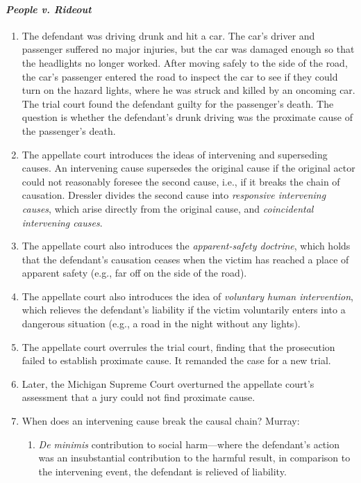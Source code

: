 \paragraph{\emph{People v. Rideout}}

\begin{enumerate}
    \item The defendant was driving drunk and hit a car. The car's driver and passenger suffered no major injuries, but the car was damaged enough so that the headlights no longer worked. After moving safely to the side of the road, the car's passenger entered the road to inspect the car to see if they could turn on the hazard lights, where he was struck and killed by an oncoming car. The trial court found the defendant guilty for the passenger's death. The question is whether the defendant's drunk driving was the proximate cause of the passenger's death.
    \item The appellate court introduces the ideas of intervening and superseding causes. An intervening cause supersedes the original cause if the original actor could not reasonably foresee the second cause, i.e., if it breaks the chain of causation. Dressler divides the second cause into \emph{responsive intervening causes}, which arise directly from the original cause, and \emph{coincidental intervening causes}.
    \item The appellate court also introduces the \emph{apparent-safety doctrine}, which holds that the defendant's causation ceases when the victim has reached a place of apparent safety (e.g., far off on the side of the road).
    \item The appellate court also introduces the idea of \emph{voluntary human intervention}, which relieves the defendant's liability if the victim voluntarily enters into a dangerous situation (e.g., a road in the night without any lights).
    \item The appellate court overrules the trial court, finding that the prosecution failed to establish proximate cause. It remanded the case for a new trial.
    \item Later, the Michigan Supreme Court overturned the appellate court's assessment that a jury could not find proximate cause.
    \item When does an intervening cause break the causal chain? Murray:
    \begin{enumerate}
        \item \emph{De minimis} contribution to social harm---where the defendant's action was an insubstantial contribution to the harmful result, in comparison to the intervening event, the defendant is relieved of liability.

\end{enumerate}
\end{enumerate}
